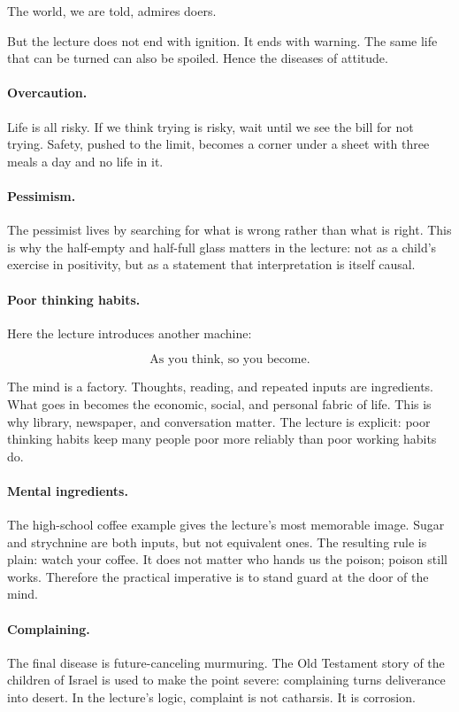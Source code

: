 The world, we are told, admires doers.

But the lecture does not end with ignition. It ends with warning. The same life that can be turned can also be spoiled. Hence the diseases of attitude.

\paragraph{Overcaution.} Life is all risky. If we think trying is risky, wait until we see the bill for not trying. Safety, pushed to the limit, becomes a corner under a sheet with three meals a day and no life in it.

\paragraph{Pessimism.} The pessimist lives by searching for what is wrong rather than what is right. This is why the half-empty and half-full glass matters in the lecture: not as a child's exercise in positivity, but as a statement that interpretation is itself causal.

\paragraph{Poor thinking habits.} Here the lecture introduces another machine:

\begin{equation}
\text{As you think, so you become}.
\end{equation}

The mind is a factory. Thoughts, reading, and repeated inputs are ingredients. What goes in becomes the economic, social, and personal fabric of life. This is why library, newspaper, and conversation matter. The lecture is explicit: poor thinking habits keep many people poor more reliably than poor working habits do.

\paragraph{Mental ingredients.} The high-school coffee example gives the lecture's most memorable image. Sugar and strychnine are both inputs, but not equivalent ones. The resulting rule is plain: watch your coffee. It does not matter who hands us the poison; poison still works. Therefore the practical imperative is to stand guard at the door of the mind.

\paragraph{Complaining.} The final disease is future-canceling murmuring. The Old Testament story of the children of Israel is used to make the point severe: complaining turns deliverance into desert. In the lecture's logic, complaint is not catharsis. It is corrosion.

